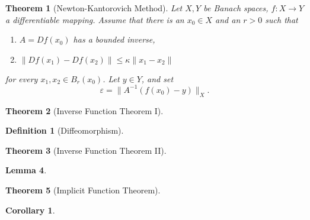 \documentclass[letterpaper,twoside,12pt]{article}
\theoremstyle{mystyle}
\newtheorem{theorem}{Theorem}[section]
\newtheorem{definition}{Definition}[section]
\newtheorem{corollary}{Corollary}[theorem]
\newtheorem{lemma}[theorem]{Lemma}
\newcommand{\ve}{\varepsilon}
\newcommand{\inv}{^{-1}}
\begin{document}
  \begin{tcolorbox}[colback=red!5!white,colframe=red!75!black]
    \begin{theorem}[Newton-Kantorovich Method]
      Let \(X, Y\) be Banach spaces, \(f:X\to Y\) a differentiable mapping. Assume that there is an \(x_0 \in X\) and an \(r>0\) such that 
      \begin{enumerate}
        \item \(A=Df(x_0)\) has a bounded inverse,
        \item \(\|Df(x_1) - Df(x_2)\| \leq \kappa \|x_1-x_2\|\)
      \end{enumerate}
      for every \(x_1, x_2 \in B_r(x_0)\). Let \(y\in Y\), and set 
      \[\ve = \|A\inv (f(x_0)-y)\|_X.\]

    \end{theorem}
  \end{tcolorbox}

  \begin{tcolorbox}[colback=red!5!white,colframe=red!75!black]
    \begin{theorem}[Inverse Function Theorem I]
      
    \end{theorem}
  \end{tcolorbox}

  \begin{definition}[Diffeomorphism]
    
  \end{definition}
  
  \begin{tcolorbox}[colback=red!5!white,colframe=red!75!black]
    \begin{theorem}[Inverse Function Theorem II]
      
    \end{theorem}
  \end{tcolorbox}

  \begin{tcolorbox}[colback=red!5!white,colframe=red!75!black]
    \begin{lemma}
      
    \end{lemma}
  \end{tcolorbox}

  \begin{tcolorbox}[colback=red!5!white,colframe=red!75!black]
    \begin{theorem}[Implicit Function Theorem]
      
    \end{theorem}
  \end{tcolorbox}
  \begin{corollary}
    
  \end{corollary}
\end{document}
